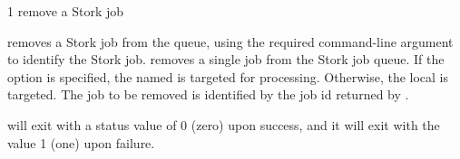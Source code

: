 \begin{ManPage}{\label{man-stork-rm}}{1}
{remove a Stork job}

\Synopsis {}
\ToolArgsBase

\Storkname
{}


\Description 

 removes a Stork job from the queue,
using the required command-line argument to identify the Stork job.
 removes a single job from the Stork job queue.  
If the  option is specified, the named  is targeted
for processing.  Otherwise, the local  is targeted.
The job to be removed is identified by the job id returned by  .

\begin{Options}
	\ToolArgsBaseDesc
	\StorknameDesc
\end{Options}

\ExitStatus

 will exit with a status value of 0 (zero) upon success,
and it will exit with the value 1 (one) upon failure.

\end{ManPage}
